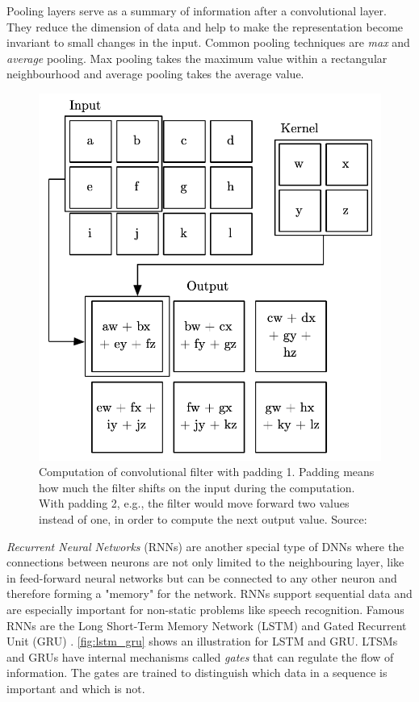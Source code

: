Pooling layers \cite{goodfellow_deep_2016} serve as a summary of information after a convolutional layer. They reduce the dimension of data and help to make the representation become invariant to small changes in the input. Common pooling techniques are \textit{max} and \textit{average} pooling. Max pooling takes the maximum value within a rectangular neighbourhood and average pooling takes the average value.



\begin{figure}
    \centering
    \includegraphics[width= 0.5 \textwidth]{images/convolution_deeplearning.png}
    \caption{Computation of convolutional filter with padding 1. Padding means how much the filter shifts on the input during the computation. With padding 2, e.g., the filter would move forward two values instead of one, in order to compute the next output value. Source: \cite{goodfellow_deep_2016}}
    \label{fig:convolution}
\end{figure}

\textit{Recurrent Neural Networks} \cite{rumelhart_learning_1986} (RNNs) are another special type of DNNs where the connections between neurons are not only limited to the neighbouring layer, like in feed-forward neural networks but can be connected to any other neuron and therefore forming a "memory" for the network. RNNs support sequential data and are especially important for non-static problems like speech recognition. Famous RNNs are the Long Short-Term Memory Network (LSTM) \cite{hochreiter_longshorttermmemory_1997} and Gated Recurrent Unit (GRU) \cite{cho_learning_2014}. \cref{fig:lstm_gru} shows an illustration for LSTM and GRU. LTSMs and GRUs have internal mechanisms called \textit{gates} that can regulate the flow of information. The gates are trained to distinguish which data in a sequence is important and which is not.

